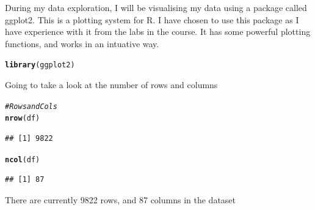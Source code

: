\documentclass{article}\usepackage[]{graphicx}\usepackage[]{color}
\makeatletter
\newcommand{\hlcom}[1]{\textcolor[rgb]{0.678,0.584,0.686}{\textit{#1}}}%
\newcommand{\hlstd}[1]{\textcolor[rgb]{0.345,0.345,0.345}{#1}}%
\newcommand{\hlkwd}[1]{\textcolor[rgb]{0.737,0.353,0.396}{\textbf{#1}}}%
\newenvironment{kframe}{%
 \def\at@end@of@kframe{}%
 \ifinner\ifhmode%
  \def\at@end@of@kframe{\end{minipage}}%
  \begin{minipage}{\columnwidth}%
 \fi\fi%
 \def\FrameCommand##1{\hskip\@totalleftmargin \hskip-\fboxsep
 \colorbox{shadecolor}{##1}\hskip-\fboxsep
     \hskip-\linewidth \hskip-\@totalleftmargin \hskip\columnwidth}%
 \MakeFramed {\advance\hsize-\width
   \@totalleftmargin\z@ \linewidth\hsize
   \@setminipage}}%
 {\par\unskip\endMakeFramed%
 \at@end@of@kframe}
\newenvironment{knitrout}{}{} %
\makeatother
\begin{document}
During my data exploration, I will be visualising my data using a package called ggplot2. This is a plotting system for R. I have chosen to use this package as I have experience with it from the labs in the course. It has some powerful plotting functions, and works in an intuative way. 
\begin{knitrout}
\color{fgcolor}\begin{kframe}
\begin{alltt}
\hlkwd{library}\hlstd{(ggplot2)}
\end{alltt}


{\ttfamily\noindent\color{warningcolor}{\#\# Warning: package 'ggplot2' was built under R version 3.4.2}}\end{kframe}
\end{knitrout}

Going to take a look at the number of rows and columns
\begin{knitrout}
\color{fgcolor}\begin{kframe}
\begin{alltt}
\hlcom{#Rows and Cols}
\hlkwd{nrow}\hlstd{(df)}
\end{alltt}
\begin{verbatim}
## [1] 9822
\end{verbatim}
\begin{alltt}
\hlkwd{ncol}\hlstd{(df)}
\end{alltt}
\begin{verbatim}
## [1] 87
\end{verbatim}
\end{kframe}
\end{knitrout}
There are currently 9822 rows, and 87 columns in the dataset 
\end{document}

